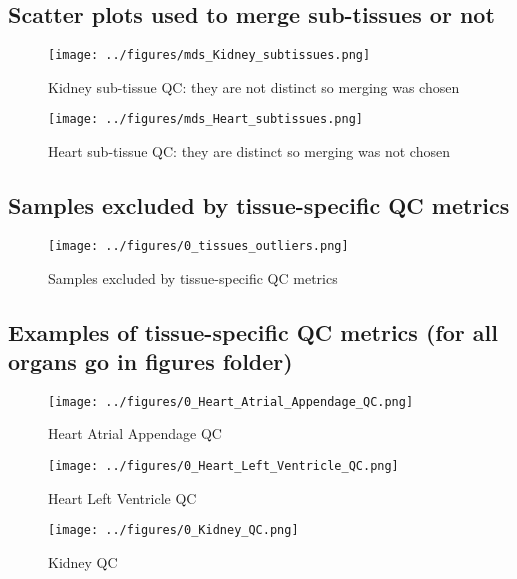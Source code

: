 \documentclass{article}
\begin{document}
\FloatBarrier
\subsection{Scatter plots used to merge sub-tissues or not}

\begin{figure}[htbp]
  \centering
  \texttt{[image: ../figures/mds\_Kidney\_subtissues.png]}
  \caption{Kidney sub-tissue QC: they are not distinct so merging was chosen}
  \label{fig:kidney_merging}
\end{figure}

\begin{figure}[htbp]
  \centering
  \texttt{[image: ../figures/mds\_Heart\_subtissues.png]}
  \caption{Heart sub-tissue QC: they are distinct so merging was not chosen}
  \label{fig:heart_merging}
\end{figure}


\FloatBarrier
\subsection{Samples excluded by tissue-specific QC metrics}

\begin{figure}[htbp]
  \centering
  \texttt{[image: ../figures/0\_tissues\_outliers.png]}
  \caption{Samples excluded by tissue-specific QC metrics}
  \label{fig:0_tissues_outliers}
\end{figure}


\FloatBarrier
\subsection{Examples of tissue-specific QC metrics (for all organs go in figures folder)}

\begin{figure}[htbp]
  \centering
  \texttt{[image: ../figures/0\_Heart\_Atrial\_Appendage\_QC.png]}
  \caption{Heart Atrial Appendage QC}
  \label{fig:0_Heart_Atrial_Appendage_QC}
\end{figure}

\begin{figure}[htbp]
  \centering
  \texttt{[image: ../figures/0\_Heart\_Left\_Ventricle\_QC.png]}
  \caption{Heart Left Ventricle QC}
  \label{fig:0_Heart_Left_Ventricle_QC}
\end{figure}

\begin{figure}[htbp]
  \centering
  \texttt{[image: ../figures/0\_Kidney\_QC.png]}
  \caption{Kidney QC}
  \label{fig:0_Kidney_QC}
\end{figure}
\end{document}

